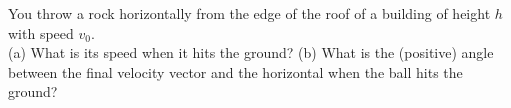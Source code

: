 You throw a rock horizontally from the edge of the roof of a building of height
$h$ with speed $v_0$.\\
%
(a) What is its speed when it hits the ground?\answercheck\hwendpart
%
(b) What is the (positive) angle
between the final velocity vector and the horizontal when the ball
hits the ground?\answercheck
